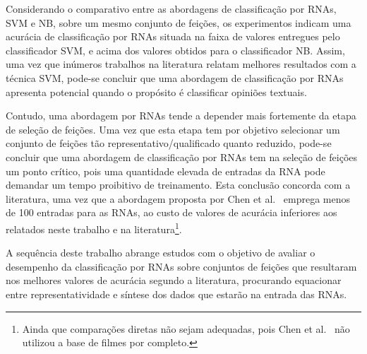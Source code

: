 \documentclass[11pt,a4paper]{article}
\begin{document}
Considerando o comparativo entre as abordagens de classificação por RNAs, SVM e NB, sobre um mesmo conjunto de feições, os experimentos indicam uma acurácia de classificação por RNAs situada na faixa de valores entregues pelo classificador SVM, e acima dos valores obtidos para o classificador NB. Assim, uma vez que inúmeros trabalhos na literatura relatam melhores resultados com a técnica SVM, pode-se concluir que uma abordagem de classificação por RNAs apresenta potencial quando o propósito é classificar opiniões textuais.

Contudo, uma abordagem por RNAs tende a depender mais fortemente da etapa de seleção de feições. Uma vez que esta etapa tem por objetivo selecionar um conjunto de feições tão representativo/qualificado quanto reduzido, pode-se concluir que uma abordagem de classificação por RNAs tem na seleção de feições um ponto crítico, pois uma quantidade elevada de entradas da RNA pode demandar um tempo proibitivo de treinamento. Esta conclusão concorda com a literatura, uma vez que a abordagem proposta por Chen et al.~\cite{Chen:blogosphere} emprega menos de 100 entradas para as RNAs, ao custo de valores de acurácia inferiores aos relatados neste trabalho e na literatura\footnote{Ainda que comparações diretas não sejam adequadas, pois Chen et al.~\cite{Chen:blogosphere} não utilizou a base de filmes por completo.}.

A sequência deste trabalho abrange estudos com o objetivo de avaliar o desempenho da classificação por RNAs sobre conjuntos de feições que resultaram nos melhores valores de acurácia segundo a literatura, procurando equacionar entre representatividade e síntese dos dados que estarão na entrada das RNAs.

\renewcommand\refname{Referências}
{\small


}
\end{document}
